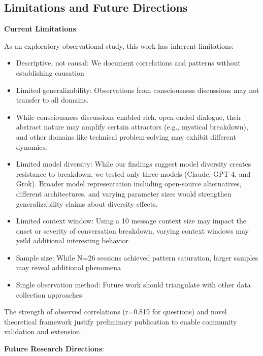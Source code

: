 \documentclass[11pt,letterpaper]{article}
\newcommand{\exponedataTotalSessionsRaw}{26}
\newcommand{\exponedataTotalSessions}{N=\exponedataTotalSessionsRaw}
\newcommand{\exponedataQuestionCorrelation}{0.819}
\begin{document}
\subsection{Limitations and Future Directions}

\textbf{Current Limitations}:

As an exploratory observational study, this work has inherent limitations:
\begin{itemize}
    \item Descriptive, not causal: We document correlations and patterns without establishing causation
    \item Limited generalizability: Observations from consciousness discussions may not transfer to all domains.  
    \item While consciousness discussions enabled rich, open-ended dialogue, their abstract nature may amplify certain attractors (e.g., mystical breakdown), and other domains like technical problem-solving may exhibit different dynamics.
    \item Limited model diversity: While our findings suggest model diversity creates resistance to breakdown, we tested only three models (Claude, GPT-4, and Grok). Broader model representation including open-source alternatives, different architectures, and varying parameter sizes would strengthen generalizability claims about diversity effects.
    \item Limited context window: Using a 10 message context size may impact the onset or severity of conversation breakdown, varying context windows may yeild additional interesting behavior
    \item Sample size: While \exponedataTotalSessions{} sessions achieved pattern saturation, larger samples may reveal additional phenomena
    \item Single observation method: Future work should triangulate with other data collection approaches
\end{itemize}

The strength of observed correlations (r=\exponedataQuestionCorrelation{} for questions) and novel theoretical framework justify preliminary publication to enable community validation and extension.

\textbf{Future Research Directions}:
\end{document}
